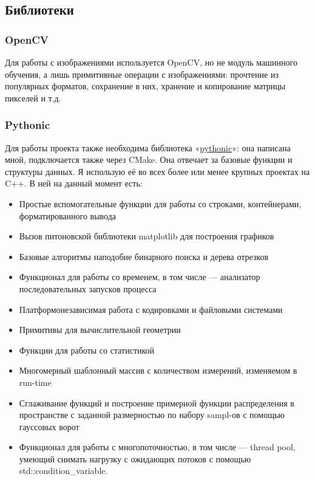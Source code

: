 \documentclass[11pt]{article}
\begin{document}
    \subsection{Библиотеки}\label{subsec:libs}

    \subsubsection{OpenCV}
    Для работы с изображениями используется OpenCV, но не модуль машинного обучения, а лишь примитивные операции с изображениями:
    прочтение из популярных форматов, сохранение в них, хранение и копирование матрицы пикселей и т.д.

    \subsubsection{Pythonic}
    Для работы проекта также необходима библиотека «\href{https://github.com/donRumata03/pythonic}{pythonic}»: она написана мной, подключается также через CMake.
    Она отвечает за базовые функции и структуры данных.
    Я использую её во всех более или менее крупных проектах на C++.
    В ней на данный момент есть:
    \begin{itemize}
        \item Простые вспомогательные функции для работы со строками, контейнерами, форматированного вывода
        \item Вызов питоновской библиотеки matplotlib для построения графиков
        \item Базовые алгоритмы наподобие бинарного поиска и дерева отрезков
        \item Функционал для работы со временем, в том числе — анализатор последовательных запусков процесса
        \item Платформонезависимая работа с кодировками и файловыми системами
        \item Примитивы для вычислительной геометрии
        \item Функции для работы со статистикой
        \item Многомерный шаблонный массив с количеством измерений, изменяемом в run-time
        \item Сглаживание функций и построение примерной функции распределения в пространстве с заданной размерностью по набору sampl-ов с помощью гауссовых ворот
        \item Функционал для работы с многопоточностью, в том числе — thread pool, умеющий снимать нагрузку с ожидающих потоков с помощью std::condition\_variable.
    \end{itemize}
\end{document}
